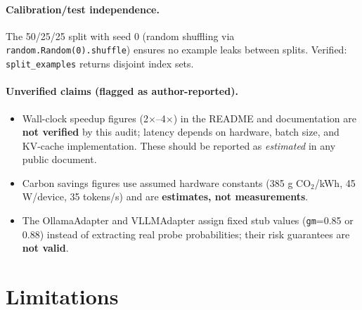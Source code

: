 \documentclass[11pt]{article}
\begin{document}
\paragraph{Calibration/test independence.}
The 50/25/25 split with seed 0 (random shuffling via
\texttt{random.Random(0).shuffle}) ensures no example leaks
between splits.  Verified: \texttt{split\_examples} returns
disjoint index sets.

\paragraph{Unverified claims (flagged as author-reported).}
\begin{itemize}
  \item Wall-clock speedup figures (2$\times$--4$\times$) in the README
        and documentation are \textbf{not verified} by this audit;
        latency depends on hardware, batch size, and KV-cache implementation.
        These should be reported as \emph{estimated} in any public document.
  \item Carbon savings figures use assumed hardware constants
        (385 g CO$_2$/kWh, 45 W/device, 35 tokens/s) and are
        \textbf{estimates, not measurements}.
  \item The OllamaAdapter and VLLMAdapter assign fixed stub values
        (\texttt{gm}=0.85 or 0.88) instead of extracting real probe
        probabilities; their risk guarantees are \textbf{not valid}.
\end{itemize}

\section{Limitations}
\label{sec:limitations}
\end{document}
